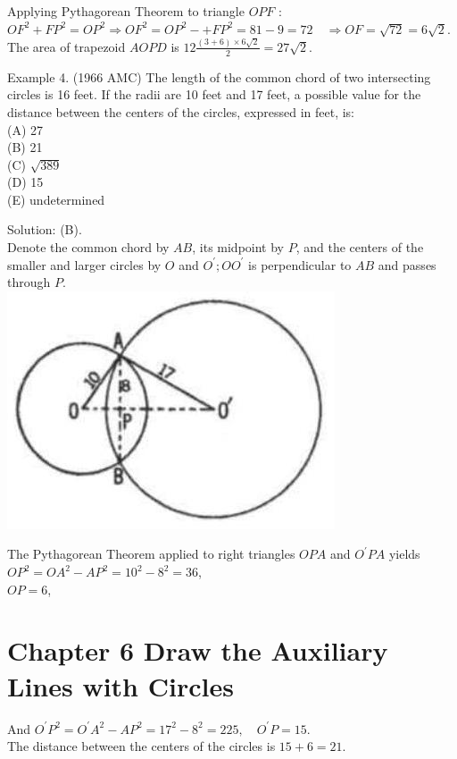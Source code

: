 \documentclass[10pt]{article}
\begin{document}
Applying Pythagorean Theorem to triangle \(O P F\) :\\
\(O F^{2}+F P^{2}=O P^{2} \Rightarrow O F^{2}=O P^{2}-+F P^{2}=81-9=72 \quad \Rightarrow O F=\sqrt{72}=6 \sqrt{2}\).\\
The area of trapezoid \(A O P D\) is \(12 \frac{(3+6) \times 6 \sqrt{2}}{2}=27 \sqrt{2}\).

Example 4. (1966 AMC) The length of the common chord of two intersecting circles is 16 feet. If the radii are 10 feet and 17 feet, a possible value for the distance between the centers of the circles, expressed in feet, is:\\
(A) 27\\
(B) 21\\
(C) \(\sqrt{389}\)\\
(D) 15\\
(E) undetermined

Solution: (B).\\
Denote the common chord by \(A B\), its midpoint by \(P\), and the centers of the smaller and larger circles by \(O\) and \(O^{\prime} ; O O^{\prime}\) is perpendicular to \(A B\) and passes through \(P\).\\
\includegraphics[max width=\textwidth, center]{2025_04_17_97bc1f7e44d93c271a88g-177(1)}

The Pythagorean Theorem applied to right triangles \(O P A\) and \(O^{\prime} P A\) yields \(O P^{2}=O A^{2}-A P^{2}=10^{2}-8^{2}=36\),\\
\(O P=6\),

\section*{Chapter 6 Draw the Auxiliary Lines with Circles}
And \(O^{\prime} P^{2}=O^{\prime} A^{2}-A P^{2}=17^{2}-8^{2}=225, \quad O^{\prime} P=15\).\\
The distance between the centers of the circles is \(15+6=21\).
\end{document}

